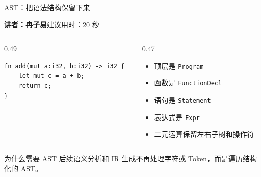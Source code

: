 \documentclass[aspectratio=169]{ctexbeamer}
\newcommand{\speaker}[2]{%
    \vspace{-0.4em}
    \begin{flushright}
        \scriptsize\color{mainblue}\textbf{讲者：#1}\quad 建议用时：#2
    \end{flushright}
    \vspace{-0.7em}
}
\begin{document}
\begin{frame}[fragile]{AST：把语法结构保留下来}
    \speaker{冉子易}{20 秒}
    \begin{columns}[T]
    \begin{column}{0.49\textwidth}
        \begin{lstlisting}[style=tinycode]
fn add(mut a:i32, b:i32) -> i32 {
    let mut c = a + b;
    return c;
}
        \end{lstlisting}
    \end{column}
    \begin{column}{0.47\textwidth}
        \begin{itemize}
            \item 顶层是 \texttt{Program}
            \item 函数是 \texttt{FunctionDecl}
            \item 语句是 \texttt{Statement}
            \item 表达式是 \texttt{Expr}
            \item 二元运算保留左右子树和操作符
        \end{itemize}
    \end{column}
    \end{columns}
    \begin{block}{为什么需要 AST}
        后续语义分析和 IR 生成不再处理字符或 Token，而是遍历结构化的 AST。
    \end{block}
\end{frame}
\end{document}
